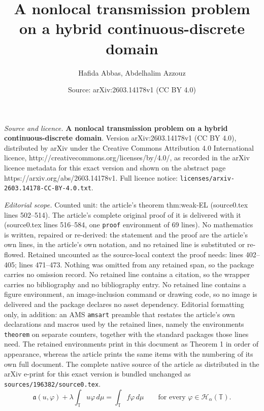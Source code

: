 \documentclass[10pt,a4paper]{amsart}
\title{\textbf{A nonlocal transmission problem on a hybrid continuous-discrete domain}}
\author{Hafida Abbas, Abdelhalim Azzouz}
\date{Source: arXiv:2603.14178v1 (CC BY 4.0)}
\newcommand{\HH}{\mathcal{H}}
\newcommand{\T}{\mathbb{T}}
\newcommand{\ddmu}{\,d\mu}
\begin{document}
\maketitle

\noindent\emph{Source and licence.} \textbf{A nonlocal transmission problem on a hybrid continuous-discrete domain}. Version arXiv:2603.14178v1 (CC BY 4.0), distributed by arXiv under the Creative Commons Attribution 4.0 International licence, http://creativecommons.org/licenses/by/4.0/, as recorded in the arXiv licence metadata for this exact version and shown on the abstract page https://arxiv.org/abs/2603.14178v1. Full licence notice: \texttt{licenses/arxiv-2603.14178-CC-BY-4.0.txt}.\par\smallskip

\noindent\textit{Editorial scope.} Counted unit: the article's theorem thm:weak-EL (source0.tex lines 502--514). The article's complete original proof of it is delivered with it (source0.tex lines 516--584, one \texttt{proof} environment of 69 lines). No mathematics is written, repaired or re-derived: the statement and the proof are the article's own lines, in the article's own notation, and no retained line is substituted or re-flowed.  Retained uncounted as the source-local context the proof needs: lines 402--405; lines 471--473.  Nothing was omitted from any retained span, so the package carries no omission record.  No retained line contains a citation, so the wrapper carries no bibliography and no bibliography entry.  No retained line contains a figure environment, an image-inclusion command or drawing code, so no image is delivered and the package declares no asset dependency.  Editorial formatting only, in addition: an AMS \texttt{amsart} preamble that restates the article's own declarations and macros used by the retained lines, namely the environments \texttt{theorem} on separate counters, together with the standard packages those lines need.  The retained environments print in this document as Theorem 1 in order of appearance, whereas the article prints the same items with the numbering of its own full document.  The complete native source of the article as distributed in the arXiv e-print for this exact version is bundled unchanged as \texttt{sources/196382/source0.tex}.
\begin{equation}\label{eq:weak-solution}
\mathfrak a(u,\varphi)+\lambda\int_{\T}u\varphi\ddmu=\int_{\T}f\varphi\ddmu
\qquad\text{for every }\varphi\in\HH_\alpha(\T).
\end{equation}
\end{document}
